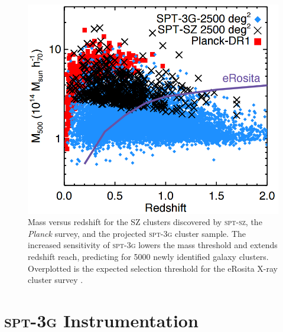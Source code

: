 \documentclass[iop]{emulateapj}
\begin{document}
\begin{figure}
	\includegraphics[width=\linewidth]{sz_clusters}
	\centering
	\caption{Mass versus redshift for the SZ clusters discovered by \textsc{spt-sz}, the \textit{Planck} survey, and the projected \textsc{spt-3g} cluster sample.  The increased sensitivity of \textsc{spt-3g} lowers the mass threshold and extends redshift reach, predicting for 5000 newly identified galaxy clusters.  Overplotted is the expected selection threshold for the eRosita X-ray cluster survey \citep{benson_spt-3g:_2014}.}
	\label{sptsz}
\end{figure}



\section{\textsc{spt-3g} Instrumentation}
\label{instrumentation_section}
\end{document}
